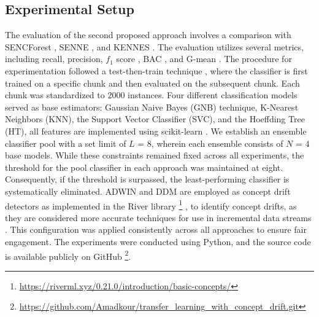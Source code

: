 \subsection{Experimental Setup}
\label{sec:setup}
The evaluation of the second proposed approach involves a comparison with SENCForest \cite{mu2017classification}, SENNE \cite{yang2021concept}, and KENNES \cite{zhang2022knnens}. The evaluation utilizes several metrics, including recall, precision, $f_1$ score \cite{sasaki2007truth}, BAC \cite{brodersen2010balanced}, and G-mean \cite{kubat1997addressing}. The procedure for experimentation followed a test-then-train technique \cite{krawczyk2017ensemble}, where the classifier is first trained on a specific chunk and then evaluated on the subsequent chunk. Each chunk was standardized to 2000 instances. Four different classification models served as base estimators: Gaussian Naive Bayes (GNB) technique, K-Nearest Neighbors (KNN), the Support Vector Classifier (SVC), and the Hoeffding Tree (HT), all features are implemented using scikit-learn \cite{ksieniewicz2022stream}. We establish an ensemble classifier pool with a set limit of $L$ = 8, wherein each ensemble consists of $N$ = 4 base models. While these constraints remained fixed across all experiments, the threshold for the pool classifier in each approach was maintained at eight. Consequently, if the threshold is surpassed, the least-performing classifier is systematically eliminated. ADWIN \cite{adams2023explainable} and DDM \cite{gama2004learning} are employed as concept drift detectors as implemented in the River library \footnote{\url{https://riverml.xyz/0.21.0/introduction/basic-concepts/}} , to identify concept drifts, as they are considered more accurate techniques for use in incremental data streams \cite{gama2004learning,adams2023explainable,madkour2023historical,baena2006early}. This configuration was applied consistently across all approaches to ensure fair engagement. The experiments were conducted using Python, and the source code is available publicly on GitHub \footnote{\url{https://github.com/Amadkour/transfer_learning_with_concept_drift.git}}.
